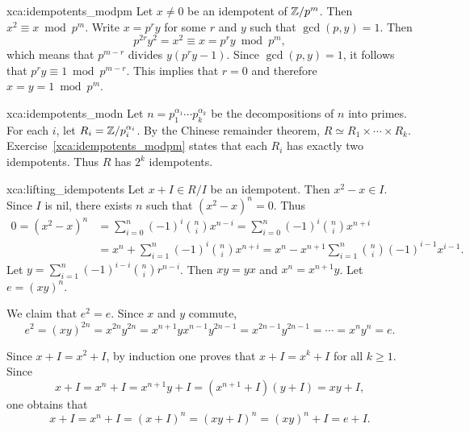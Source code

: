 \begin{sol}{xca:idempotents_modpm}
    Let $x\ne 0$ be an idempotent of $\mathbb{Z}/p^m$. Then $x^2\equiv x\bmod p^m$. 
    Write $x=p^ry$ for some $r$ and $y$ such that $\gcd(p,y)=1$. Then 
    \[
    p^{2r}y^2=x^2\equiv x=p^ry\bmod p^m,
    \]
    which means that $p^{m-r}$ divides $y(p^ry-1)$. Since 
    $\gcd(p,y)=1$, it follows that 
    $p^ry\equiv 1\bmod p^{m-r}$. This implies that $r=0$ and 
    therefore $x=y=1\bmod p^m$.
\end{sol}

\begin{sol}{xca:idempotents_modn}
    Let $n=p_1^{\alpha_1}\cdots p_k^{\alpha_k}$ be the decompositions 
    of $n$ into primes. For each $i$, let $R_i=\mathbb{Z}/p_i^{\alpha_i}$. By the 
    Chinese remainder theorem, $R\simeq R_1\times\cdots\times R_k$. Exercise~\ref{xca:idempotents_modpm} states that each $R_i$ has exactly  
    two idempotents. Thus $R$ has $2^k$ idempotents. 
\end{sol}

\begin{sol}{xca:lifting_idempotents}
    Let $x+I\in R/I$ be an idempotent. Then $x^2-x\in I$. Since $I$ is nil, 
    there exists $n$ such that $(x^2-x)^n=0$. Thus 
    \begin{align*}    
    0=(x^2-x)^n&=\sum_{i=0}^n (-1)^i\binom{n}{i}x^{n-i}
    =\sum_{i=0}^n(-1)^i\binom{n}{i}x^{n+i}\\
    &=x^n+\sum_{i=1}^n(-1)^i\binom{n}{i}x^{n+i}
    =x^n-x^{n+1}\sum_{i=1}^n\binom{n}{i}(-1)^{i-1}x^{i-1}.
    \end{align*}
    Let $y=\sum_{i=1}^n (-1)^{i-i}\binom{n}{i}r^{n-i}$. Then 
    $xy=yx$ and $x^n=x^{n+1}y$. Let $e=(xy)^n$. 

    We claim that $e^2=e$. Since $x$ and $y$ commute, 
    \[
    e^2=(xy)^{2n}=x^{2n}y^{2n}=x^{n+1}yx^{n-1}y^{2n-1}=x^{2n-1}y^{2n-1}=\cdots=x^ny^n=e.
    \]
    
    Since $x+I=x^2+I$, 
    by induction one proves that $x+I=x^k+I$ for all $k\geq1$. Since 
    \[
    x+I=x^n+I=x^{n+1}y+I=(x^{n+1}+I)(y+I)=xy+I, 
    \]
    one obtains that 
    \[
    x+I=x^n+I=(x+I)^n=(xy+I)^n=(xy)^n+I=e+I.
    \]
\end{sol}

